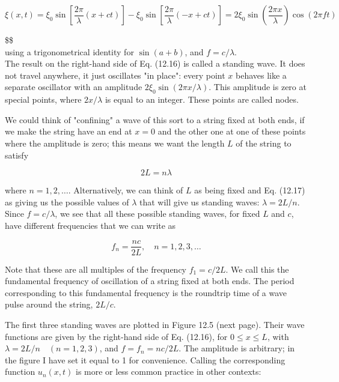 \documentclass[10pt]{article}
\begin{document}
\begin{equation*}
\xi(x, t)=\xi_{0} \sin \left[\frac{2 \pi}{\lambda}(x+c t)\right]-\xi_{0} \sin \left[\frac{2 \pi}{\lambda}(-x+c t)\right]=2 \xi_{0} \sin \left(\frac{2 \pi x}{\lambda}\right) \cos (2 \pi f t) \tag{12.16}
\end{equation*}

\$\$\\
using a trigonometrical identity for $\sin (a+b)$, and $f=c / \lambda$.\\
The result on the right-hand side of Eq. (12.16) is called a standing wave. It does not travel anywhere, it just oscillates "in place": every point $x$ behaves like a separate oscillator with an amplitude $2 \xi_{0} \sin (2 \pi x / \lambda)$. This amplitude is zero at special points, where $2 x / \lambda$ is equal to an integer. These points are called nodes.

We could think of "confining" a wave of this sort to a string fixed at both ends, if we make the string have an end at $x=0$ and the other one at one of these points where the amplitude is zero; this means we want the length $L$ of the string to satisfy


\begin{equation*}
2 L=n \lambda \tag{12.17}
\end{equation*}


where $n=1,2, \ldots$. Alternatively, we can think of $L$ as being fixed and Eq. (12.17) as giving us the possible values of $\lambda$ that will give us standing waves: $\lambda=2 L / n$. Since $f=c / \lambda$, we see that all these possible standing waves, for fixed $L$ and $c$, have different frequencies that we can write as


\begin{equation*}
f_{n}=\frac{n c}{2 L}, \quad n=1,2,3, \ldots \tag{12.18}
\end{equation*}


Note that these are all multiples of the frequency $f_{1}=c / 2 L$. We call this the fundamental frequency of oscillation of a string fixed at both ends. The period corresponding to this fundamental frequency is the roundtrip time of a wave pulse around the string, $2 L / c$.

The first three standing waves are plotted in Figure 12.5 (next page). Their wave functions are given by the right-hand side of Eq. (12.16), for $0 \leq x \leq L$, with $\lambda=2 L / n \quad(n=1,2,3)$, and $f=f_{n}=n c / 2 L$. The amplitude is arbitrary; in the figure I have set it equal to 1 for convenience. Calling the corresponding function $u_{n}(x, t)$ is more or less common practice in other contexts:
\end{document}
